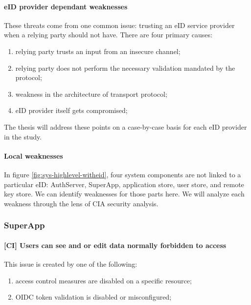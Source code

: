 \paragraph{eID provider dependant weaknesses}

These threats come from one common issue: trusting an eID service provider when a relying party should not have. There are four primary causes:

\begin{enumerate}
  \item relying party trusts an input from an insecure channel;
  \item relying party does not perform the necessary validation mandated by the protocol;
  \item weakness in the architecture of transport protocol;
  \item eID provider itself gets compromised;
\end{enumerate}

The thesis will address these points on a case-by-case basis for each eID provider in the study.

\paragraph{Local weaknesses}

In figure \ref{fig:sys-highlevel-witheid}, four system components are not linked to a particular eID: AuthServer, SuperApp, application store, user store, and remote key store. We can identify weaknesses for those parts here. We will analyze each weakness through the lens of CIA security analysis.

\subsubsection{SuperApp}

\paragraph{[CI] Users can see and or edit data normally forbidden to access} This issue is created by one of the following:

\begin{enumerate}
  \item access control measures are disabled on a specific resource;
  \item OIDC token validation is disabled or misconfigured;
\end{enumerate}

